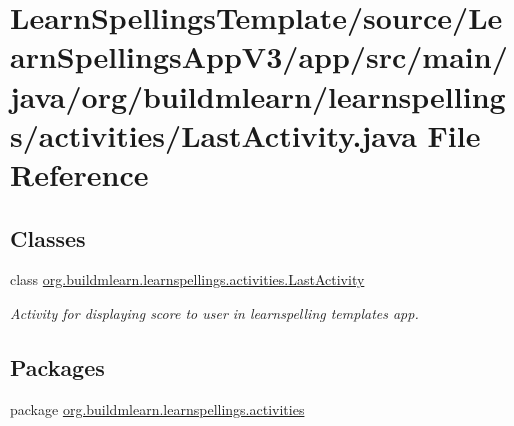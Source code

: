 \hypertarget{LearnSpellingsTemplate_2source_2LearnSpellingsAppV3_2app_2src_2main_2java_2org_2buildmlearn_2leaf6fc24ec35619a9a33c98a076823a3a6}{}\section{Learn\+Spellings\+Template/source/\+Learn\+Spellings\+App\+V3/app/src/main/java/org/buildmlearn/learnspellings/activities/\+Last\+Activity.java File Reference}
\label{LearnSpellingsTemplate_2source_2LearnSpellingsAppV3_2app_2src_2main_2java_2org_2buildmlearn_2leaf6fc24ec35619a9a33c98a076823a3a6}
\subsection*{Classes}
\begin{DoxyCompactItemize}
\item 
class \hyperlink{classorg_1_1buildmlearn_1_1learnspellings_1_1activities_1_1LastActivity}{org.\+buildmlearn.\+learnspellings.\+activities.\+Last\+Activity}
\begin{DoxyCompactList}\small\item\em Activity for displaying score to user in learnspelling template\textquotesingle{}s app. \end{DoxyCompactList}\end{DoxyCompactItemize}
\subsection*{Packages}
\begin{DoxyCompactItemize}
\item 
package \hyperlink{namespaceorg_1_1buildmlearn_1_1learnspellings_1_1activities}{org.\+buildmlearn.\+learnspellings.\+activities}
\end{DoxyCompactItemize}
